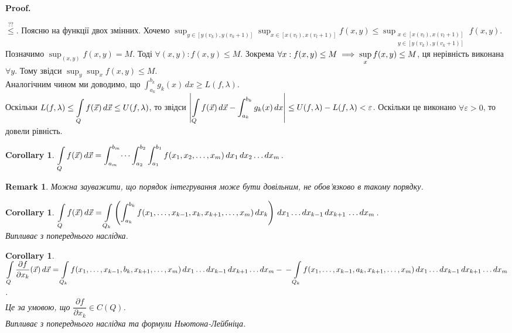 \documentclass[a4paper, 10pt]{article}
\makeatletter
\def\departial#1#2{\dfrac{\partial {#1}}{\partial {#2}}}
\def\qed{$\blacksquare$}
\theoremstyle{theoremdd}
\theoremstyle{theoremdd}
\theoremstyle{theoremdd}
\theoremstyle{theoremdd}
\theoremstyle{theoremdd}
\theoremstyle{theoremdd}
\theoremstyle{theoremdd}
\theoremstyle{theoremdd}
\theoremstyle{theoremdd}
\theoremstyle{theoremdd}
\theoremstyle{theoremdd}
\newtheorem{remark}[theorem]{Remark}
\theoremstyle{theoremdd}
\theoremstyle{theoremdd}
\theoremstyle{theoremdd}
\newtheorem{corollary}[theorem]{Corollary}
\theoremstyle{theoremdd}
\renewenvironment{proof}[1][Proof.\\]{\par
\pushQED{\hfill \qed}%
\normalfont \topsep6\p@\@plus6\p@\relax
\trivlist
\item\relax
{\bfseries
#1\@addpunct{.}}\hspace\labelsep\ignorespaces
}{%
\popQED\endtrivlist\@endpefalse
}
\makeatother
\begin{document}
\begin{proof}
$\overset{??}{\leq}$. Поясню на функції двох змінних. Хочемо $\displaystyle\sup_{y \in [y(v_k),y(v_k+1)]} \sup_{x \in [x(v_l),x(v_l+1)]} f(x,y) \leq \sup_{\substack{x \in [x(v_l),x(v_l+1)] \\ y \in [y(v_k),y(v_k+1)]}} f(x,y)$.\\
Позначимо $\displaystyle\sup_{(x,y)} f(x,y) = M$. Тоді $\forall (x,y): f(x,y) \leq M$. Зокрема $\forall x: f(x,y) \leq M \\ \implies \displaystyle\sup_x f(x,y) \leq M$, ця нерівність виконана $\forall y$. Тому звідси $\displaystyle\sup_y \sup_x f(x,y) \leq M$.\\
Аналогічним чином ми доводимо, що $\displaystyle\int_{a_k}^{b_k} g_k(x)\,dx \geq L(f,\lambda)$.\\
Оскільки $L(f,\lambda) \leq \displaystyle\int\displaylimits_Q f(\vec{x})\,d \vec{x} \leq U(f,\lambda)$, то звідси $\displaystyle\abs{\int\displaylimits_Q f(\vec{x})\,d \vec{x} - \int_{a_k}^{b_k} g_k(x)\,dx} \leq U(f,\lambda) - L(f,\lambda) < \varepsilon$. Оскільки це виконано $\forall \varepsilon >0$, то довели рівність.
\end{proof}

\begin{corollary}
$\displaystyle\int\displaylimits_Q f(\vec{x})\,d\vec{x} = \int_{a_m}^{b_m} \dots \int_{a_2}^{b_2} \int_{a_1}^{b_1} f(x_1,x_2,\dots,x_m)\,dx_1\,dx_2 \dots dx_m$.
\end{corollary}

\begin{remark}
Можна зауважити, що порядок інтегрування може бути довільним, не обов'язково в такому порядку.
\end{remark}

\begin{corollary}
\label{multiple_integral_reducing_dimension_2}
$\displaystyle\int\displaylimits_Q f(\vec{x})\,d\vec{x} = \int\displaylimits_{Q_k} \left( \int_{a_k}^{b_k} f(x_1,\dots,x_{k-1},x_k,x_{k+1},\dots,x_m)\,dx_k \right)\,dx_1 \dots dx_{k-1}\,dx_{k+1}\,\dots dx_m$.\\
\textit{Випливає з попереднього наслідка.}
\end{corollary}

\begin{corollary}
\label{lagrange_and_integral}
$\displaystyle\int\displaylimits_Q \departial{f}{x_k}(\vec{x})\,d\vec{x} = \displaystyle\int\displaylimits_{Q_k} f(x_1,\dots,x_{k-1},b_k,x_{k+1},\dots,x_m)\,dx_1\dots dx_{k-1}\,dx_{k+1}\dots dx_m - \\ - \int\displaylimits_{Q_k} f(x_1,\dots,x_{k-1},a_k,x_{k+1},\dots,x_m)\,dx_1\dots dx_{k-1}\,dx_{k+1}\dots dx_m$.\\
Це за умовою, що $\departial{f}{x_k} \in C(Q)$.\\
\textit{Випливає з попереднього наслідка та формули Ньютона-Лейбніца.}
\end{corollary}
\end{document}
